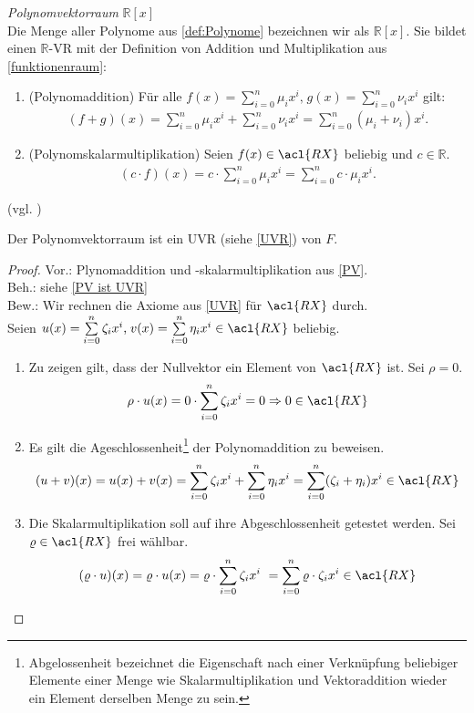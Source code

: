 \theoremstyle{Satz}
\begin{Satz}{\emph{Polynomvektorraum} $\mathbb{R}[x]$}
\label{PV}
\\ Die Menge aller Polynome aus \ref{def:Polynome} bezeichnen wir als $\mathbb{R}[x]$. Sie bildet einen $\mathbb{R}$-\acl{VR} mit der Definition von Addition und Multiplikation aus \ref{funktionenraum}:
\begin{enumerate}

\item (Polynomaddition) Für alle \(f(x)=\sum\limits_{i=0}^{n} \mu_i x^i\text{,}\; g(x)=\sum \limits_{i=0}^n \nu_i x^i\) gilt:
\begin{align}(f+g)(x) = \sum_{i=0}^{n}\mu_i x^i + \sum_{i=0}^{n} \nu_i x^i = \sum_{i=0}^{n} (\mu_i + \nu_i)x^i \text{.}\end{align}
\item (Polynomskalarmultiplikation)
Seien $f(x) \in \acl{RX}$ beliebig und $c \in \mathbb{R}$.
\begin{align}
(c \cdot f) (x) = c \cdot \sum_{i=0}^{n} \mu_i x^i= \sum_{i=0}^{n} c \cdot \mu_i x^i\text{.}
\end{align}
\end{enumerate}
(vgl. \cite[S. 44f., 1.28]{Springer})
\end{Satz}

\theoremstyle{Corollar}
\begin{Corollar}
\label{PV ist UVR}
Der Polynomvektorraum ist ein \acl{UVR} (siehe \ref{UVR}) von $F$.
\end{Corollar}

\begin{proof}
Vor.: Plynomaddition und -skalarmultiplikation aus \ref{PV}.
\\ Beh.: siehe \ref{PV ist UVR}
\\ Bew.: Wir rechnen die Axiome aus \ref{UVR} für $\acl{RX}$ durch.
\\ Seien $u(x)=\sum\limits_{i=0}^{n} \zeta_i x^i\text{,}\; v(x) = \sum\limits_{i=0}^{n} \eta_i x^i \in \acl{RX}$ beliebig.
\begin{enumerate}
\item Zu zeigen gilt, dass der Nullvektor ein Element von $\acl{RX}$ ist. Sei $\rho = 0$. \[\rho \cdot u(x)= 0 \cdot \sum\limits_{i=0}^{n} \zeta_i x^i = 0 \Rightarrow 0 \in \acl{RX}\]
\item Es gilt die Ageschlossenheit\footnote{Abgelossenheit bezeichnet die Eigenschaft nach einer Verknüpfung beliebiger Elemente einer Menge wie Skalarmultiplikation und Vektoraddition wieder ein Element derselben Menge zu sein.} der Polynomaddition zu beweisen.
\\ \[ (u+v)(x)=u(x) + v(x) = \sum\limits_{i=0}^{n} \zeta_i x^i+\sum\limits_{i=0}^{n} \eta_i x^i =\sum\limits_{i=0}^{n} (\zeta_i+ \eta_i )x^i \in \acl{RX} \]
\item Die Skalarmultiplikation soll auf ihre Abgeschlossenheit getestet werden. Sei $\varrho \in \acl{RX}$ frei wählbar.
\[(\varrho \cdot u)(x) = \varrho \cdot u(x)= \varrho \cdot \sum\limits_{i=0}^{n} \zeta_i x^i\ = \sum\limits_{i=0}^{n} \varrho \cdot \zeta_i x^i \in \acl{RX}\]
\end{enumerate}
\end{proof}

